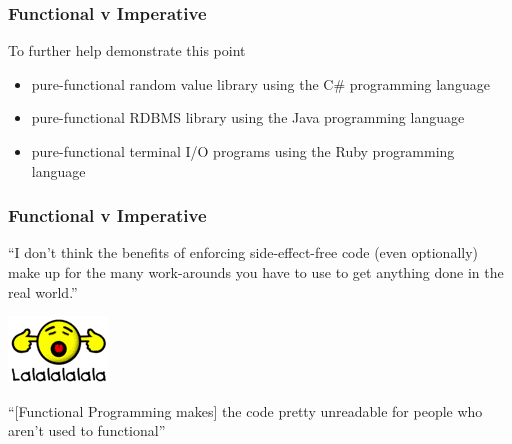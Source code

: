 \begin{frame}[fragile]
\frametitle{Functional v Imperative}
\begin{block}{To further help demonstrate this point}
\begin{itemize}
  \item<1> pure-functional random value library using the C\# programming language
  \item<2> pure-functional RDBMS library using the Java programming language
  \item<3> pure-functional terminal I/O programs using the Ruby programming language
\end{itemize}
\end{block}
\end{frame}


\begin{frame}[fragile]
\frametitle{Functional v Imperative}
``I don't think the benefits of enforcing side-effect-free code (even optionally) make up for the many work-arounds you have to use to get anything done in the real world.''
\begin{center}
\includegraphics[width=0.1\paperwidth]{image/lalala.png}
\end{center}
``[Functional Programming makes] the code pretty unreadable for people who aren't used to functional''
\end{frame}

% 